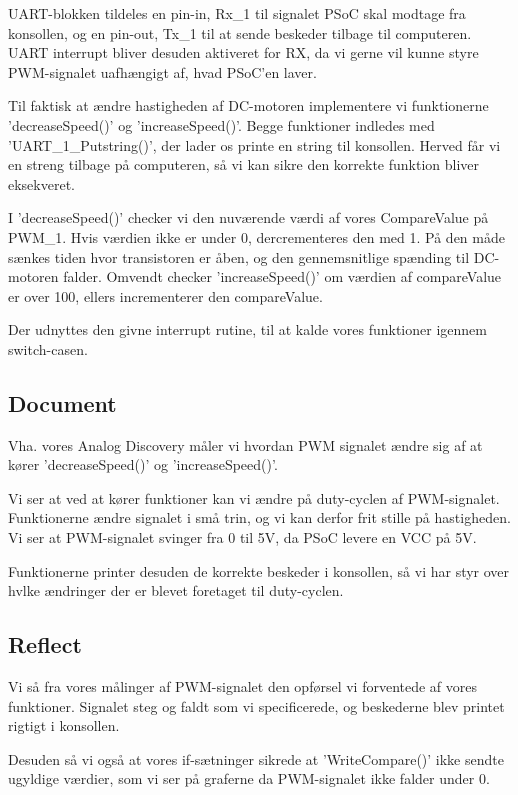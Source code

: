 \documentclass[../main.tex]{subfiles}
\begin{document}
UART-blokken tildeles en pin-in, Rx\_1 til signalet PSoC skal modtage fra konsollen, og en pin-out, Tx\_1 til at sende beskeder tilbage til computeren. UART interrupt bliver desuden aktiveret for RX, da vi gerne vil kunne styre PWM-signalet uafhængigt af, hvad PSoC'en laver.

Til faktisk at ændre hastigheden af DC-motoren implementere vi funktionerne ’decreaseSpeed()’ og ’increaseSpeed()’. Begge funktioner indledes med ’UART\_1\_Putstring()’, der lader os printe en string til konsollen. Herved får vi en streng tilbage på computeren, så vi kan sikre den korrekte funktion bliver eksekveret.


I ’decreaseSpeed()’ checker vi den nuværende værdi af vores CompareValue på PWM\_1. Hvis værdien ikke er under 0, dercrementeres den med 1. På den måde sænkes tiden hvor transistoren er åben, og den gennemsnitlige spænding til DC-motoren falder. Omvendt checker 'increaseSpeed()' om værdien af compareValue er over 100, ellers incrementerer den compareValue.

Der udnyttes den givne interrupt rutine, til at kalde vores funktioner igennem switch-casen.

\subsection{Document}
Vha. vores Analog Discovery måler vi hvordan PWM signalet ændre sig af at kører ’decreaseSpeed()’ og ’increaseSpeed()’.


Vi ser at ved at kører funktioner kan vi ændre på duty-cyclen af PWM-signalet. Funktionerne ændre signalet i små trin, og vi kan derfor frit stille på hastigheden. Vi ser at PWM-signalet svinger fra 0 til 5V, da PSoC levere en VCC på 5V.

Funktionerne printer desuden de korrekte beskeder i konsollen, så vi har styr over hvlke ændringer der er blevet foretaget til duty-cyclen.

\subsection{Reflect}    
Vi så fra vores målinger af PWM-signalet den opførsel vi forventede af vores funktioner. Signalet steg og faldt som vi specificerede, og beskederne blev printet rigtigt i konsollen.

Desuden så vi også at vores if-sætninger sikrede at ’WriteCompare()’ ikke sendte ugyldige værdier, som vi ser på graferne da PWM-signalet ikke falder under 0.
\end{document}
